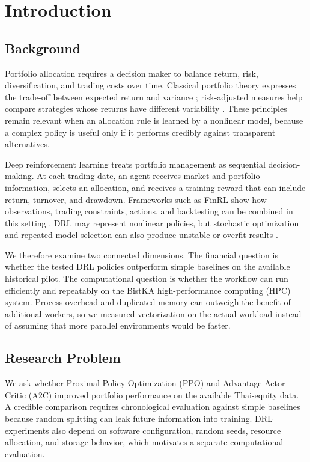 \documentclass[12pt,a4paper,oneside]{book}
\theoremstyle{plain}
\numberwithin{equation}{chapter} \DeclareMathOperator{\Var}{Var}
\begin{document}
\chapter{Introduction}

\section{Background}

Portfolio allocation requires a decision maker to balance return, risk, diversification, and trading costs over time. Classical portfolio theory expresses the trade-off between expected return and variance \cite{markowitz1952}; risk-adjusted measures help compare strategies whose returns have different variability \cite{sharpe1994}. These principles remain relevant when an allocation rule is learned by a nonlinear model, because a complex policy is useful only if it performs credibly against transparent alternatives.

Deep reinforcement learning treats portfolio management as sequential decision-making. At each trading date, an agent receives market and portfolio information, selects an allocation, and receives a training reward that can include return, turnover, and drawdown. Frameworks such as FinRL show how observations, trading constraints, actions, and backtesting can be combined in this setting \cite{liu2020finrl}. DRL may represent nonlinear policies, but stochastic optimization and repeated model selection can also produce unstable or overfit results \cite{bailey2017backtest,henderson2018drl}.

We therefore examine two connected dimensions. The financial question is whether the tested DRL policies outperform simple baselines on the available historical pilot. The computational question is whether the workflow can run efficiently and repeatably on the BistKA high-performance computing (HPC) system. Process overhead and duplicated memory can outweigh the benefit of additional workers, so we measured vectorization on the actual workload instead of assuming that more parallel environments would be faster.

\section{Research Problem}

We ask whether Proximal Policy Optimization (PPO) and Advantage Actor-Critic (A2C) improved portfolio performance on the available Thai-equity data. A credible comparison requires chronological evaluation against simple baselines because random splitting can leak future information into training. DRL experiments also depend on software configuration, random seeds, resource allocation, and storage behavior, which motivates a separate computational evaluation.
\end{document}
